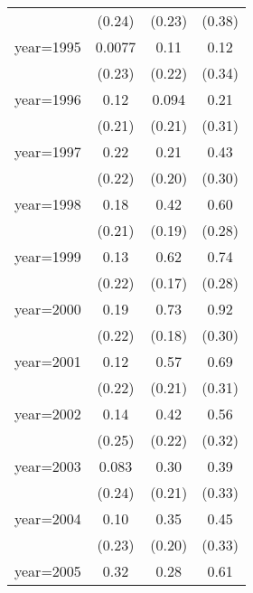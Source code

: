 \begin{sidewaystable}[htbp]
\begin{tabular}{l*{3}{c}}
                &   (0.24)         &   (0.23)         &   (0.38)         \\
\addlinespace
year=1995       &   0.0077         &     0.11         &     0.12         \\
                &   (0.23)         &   (0.22)         &   (0.34)         \\
\addlinespace
year=1996       &     0.12         &    0.094         &     0.21         \\
                &   (0.21)         &   (0.21)         &   (0.31)         \\
\addlinespace
year=1997       &     0.22         &     0.21         &     0.43         \\
                &   (0.22)         &   (0.20)         &   (0.30)         \\
\addlinespace
year=1998       &     0.18         &     0.42\sym{**} &     0.60\sym{**} \\
                &   (0.21)         &   (0.19)         &   (0.28)         \\
\addlinespace
year=1999       &     0.13         &     0.62\sym{***}&     0.74\sym{**} \\
                &   (0.22)         &   (0.17)         &   (0.28)         \\
\addlinespace
year=2000       &     0.19         &     0.73\sym{***}&     0.92\sym{***}\\
                &   (0.22)         &   (0.18)         &   (0.30)         \\
\addlinespace
year=2001       &     0.12         &     0.57\sym{***}&     0.69\sym{**} \\
                &   (0.22)         &   (0.21)         &   (0.31)         \\
\addlinespace
year=2002       &     0.14         &     0.42\sym{*}  &     0.56\sym{*}  \\
                &   (0.25)         &   (0.22)         &   (0.32)         \\
\addlinespace
year=2003       &    0.083         &     0.30         &     0.39         \\
                &   (0.24)         &   (0.21)         &   (0.33)         \\
\addlinespace
year=2004       &     0.10         &     0.35\sym{*}  &     0.45         \\
                &   (0.23)         &   (0.20)         &   (0.33)         \\
\addlinespace
year=2005       &     0.32         &     0.28         &     0.61\sym{*}  \\

\end{tabular}
\end{sidewaystable}
